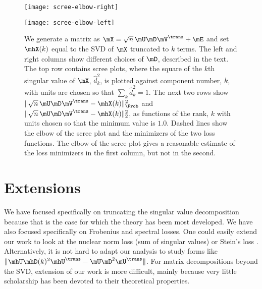 \begin{figure}[ht]
    \begin{center}
        \begin{minipage}{0.49\textwidth}
            \begin{center}
                \texttt{[image: scree-elbow-right]}
            \end{center}
        \end{minipage}
        \begin{minipage}{0.49\textwidth}
            \begin{center}
                \texttt{[image: scree-elbow-left]}
            \end{center}
        \end{minipage}
        \caption{
            We generate a matrix as 
            $\mX = \sqrt{n} \, \mU \mD \mV^\trans + \mE$ 
            and set $\mhX(k)$ equal to the SVD of $\mX$ truncated to $k$ 
            terms.  The left and right columns show different choices of
            $\mD$, described in the text.  The top row contains scree plots, 
            where the square of the $k$th singular value of $\mX$,
            $\hat d_k^2$, is plotted against 
            component number, $k$, with units are chosen so that 
            $\sum_{k} \hat d_k^2 = 1$.  The next two rows show
            $\| \sqrt{n} \, \mU \mD \mV^\trans - \mhX(k) \|_\Frob^2$ and
            $\| \sqrt{n} \, \mU \mD \mV^\trans - \mhX(k) \|_2^2$, as functions
            of the rank, $k$ with units chosen so that the minimum value is
            $1.0$.  Dashed lines show the elbow of the scree plot and the
            minimizers of the two loss functions.  
            The elbow of the scree plot gives a reasonable estimate of
            the loss minimizers in the first column, but not in the second.
        }\label{F:scree-elbow}
    \end{center}
\end{figure}

\clearpage

\section{Extensions}\label{S:intrinsic-rank-extensions}

We have focused specifically on truncating the singular value decomposition
because that is the case for which the theory has been most developed. We have
also focused specifically on Frobenius and spectral losses. One could easily
extend our work to look at the nuclear norm loss (sum of singular values)
\cite{fazel2002mrm} or Stein's loss \cite{james1961ewq}. Alternatively, it is
not hard to adapt our analysis to study forms like $\| \mhU \mhD(k)^2
\mhU^\trans - \mU \mD^2 \mU^\trans \|$. For matrix decompositions beyond the
SVD, extension of our work is more difficult, mainly because very little
scholarship has been devoted to their theoretical properties.

